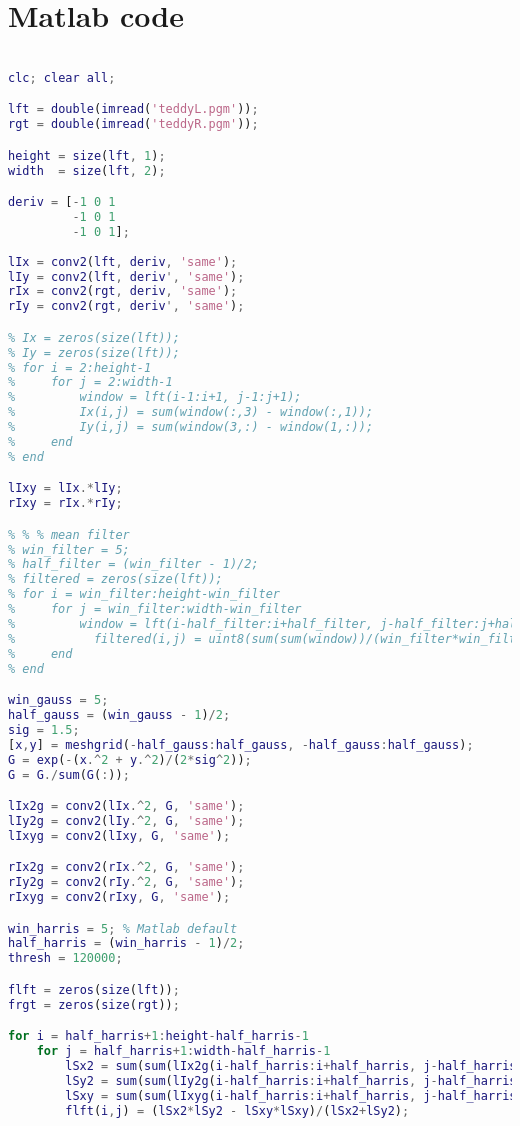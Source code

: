 \documentclass{article}
\begin{document}
\section{Matlab code}
\begin{lstlisting}[language=Matlab]

clc; clear all;

lft = double(imread('teddyL.pgm'));
rgt = double(imread('teddyR.pgm'));

height = size(lft, 1);
width  = size(lft, 2);

deriv = [-1 0 1
         -1 0 1
         -1 0 1];
     
lIx = conv2(lft, deriv, 'same');
lIy = conv2(lft, deriv', 'same');
rIx = conv2(rgt, deriv, 'same');
rIy = conv2(rgt, deriv', 'same');

% Ix = zeros(size(lft));
% Iy = zeros(size(lft));
% for i = 2:height-1
%     for j = 2:width-1
%         window = lft(i-1:i+1, j-1:j+1);
%         Ix(i,j) = sum(window(:,3) - window(:,1));
%         Iy(i,j) = sum(window(3,:) - window(1,:));             
%     end
% end

lIxy = lIx.*lIy;
rIxy = rIx.*rIy;

% % % mean filter
% win_filter = 5;
% half_filter = (win_filter - 1)/2;
% filtered = zeros(size(lft));
% for i = win_filter:height-win_filter
%     for j = win_filter:width-win_filter
%         window = lft(i-half_filter:i+half_filter, j-half_filter:j+half_filter);     
%        	filtered(i,j) = uint8(sum(sum(window))/(win_filter*win_filter));
%     end
% end

win_gauss = 5;
half_gauss = (win_gauss - 1)/2;
sig = 1.5;
[x,y] = meshgrid(-half_gauss:half_gauss, -half_gauss:half_gauss);
G = exp(-(x.^2 + y.^2)/(2*sig^2));
G = G./sum(G(:));

lIx2g = conv2(lIx.^2, G, 'same');
lIy2g = conv2(lIy.^2, G, 'same');
lIxyg = conv2(lIxy, G, 'same');

rIx2g = conv2(rIx.^2, G, 'same');
rIy2g = conv2(rIy.^2, G, 'same');
rIxyg = conv2(rIxy, G, 'same');

win_harris = 5; % Matlab default
half_harris = (win_harris - 1)/2;
thresh = 120000;

flft = zeros(size(lft));
frgt = zeros(size(rgt));

for i = half_harris+1:height-half_harris-1
    for j = half_harris+1:width-half_harris-1
        lSx2 = sum(sum(lIx2g(i-half_harris:i+half_harris, j-half_harris:j+half_harris)));
        lSy2 = sum(sum(lIy2g(i-half_harris:i+half_harris, j-half_harris:j+half_harris))); 
        lSxy = sum(sum(lIxyg(i-half_harris:i+half_harris, j-half_harris:j+half_harris)));
        flft(i,j) = (lSx2*lSy2 - lSxy*lSxy)/(lSx2+lSy2);
        

\end{lstlisting}
\end{document}
